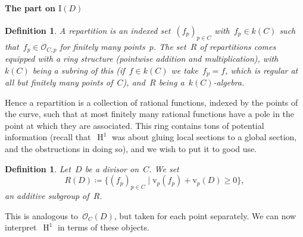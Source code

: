 \documentclass[10pt,a4paper]{article}
\theoremstyle{lecture}
\newtheorem{definition}[theorem]{Definition}
\newcommand\dash{\nobreakdash-\hspace{0pt}}
\DeclareMathOperator\HH{H}
\begin{document}
\paragraph{The part on $\mathrm{I}(D)$}
\begin{definition}
  A \emph{repartition} is an indexed set~$(f_p)_{p\in C}$ with~$f_p\in k(C)$ such that~$f_p\in\mathcal{O}_{C,p}$ for finitely many points~$p$. The set~$R$ of repartitions comes equipped with a ring structure (pointwise addition and multiplication), with~$k(C)$ being a subring of this (if~$f\in k(C)$ we take~$f_p=f$, which is regular at all but finitely many points of~$C$), and~$R$ being a~$k(C)$\dash algebra.
\end{definition}
Hence a repartition is a collection of rational functions, indexed by the points of the curve, such that at most finitely many rational functions have a pole in the point at which they are associated. This ring contains tons of potential information (recall that~$\HH^1$ was about gluing local sections to a global section, and the obstructions in doing so), and we wish to put it to good use.
\begin{definition}
  Let~$D$ be a divisor on~$C$. We set
  \begin{equation}
    R(D)\coloneqq\{(f_p)_{p\in C}\mid \mathrm{v}_p(f_p)+\mathrm{v}_p(D)\geq 0\},
  \end{equation}
  an additive subgroup of~$R$.
\end{definition}
This is analogous to~$\mathcal{O}_C(D)$, but taken for each point separately. We can now interpret~$\HH^1$ in terms of these objects.
\end{document}
